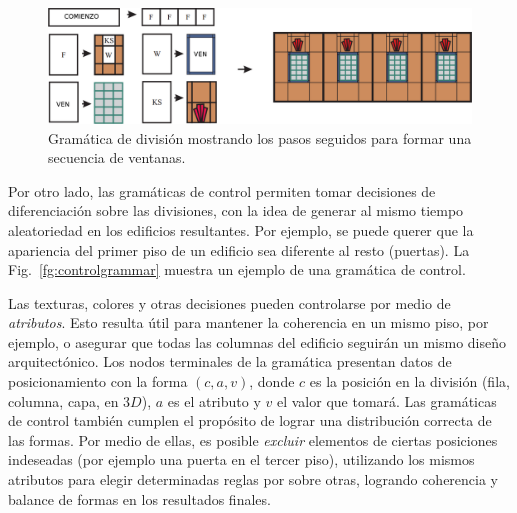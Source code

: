 \begin{figure}
\center
\includegraphics[width=13cm]{figures/splitgrammar}
\caption[Gramática para formar una secuencia de ventanas]{Gramática de división mostrando los pasos seguidos para formar una secuencia de ventanas.}
\label{fg:splitgrammar}
\end{figure}

Por otro lado, las gramáticas de control permiten tomar decisiones de diferenciación sobre las divisiones, con la idea de generar al mismo tiempo aleatoriedad en los edificios resultantes.
Por ejemplo, se puede querer que la apariencia del primer piso de un edificio sea diferente al resto (puertas).
La Fig.~\ref{fg:controlgrammar} muestra un ejemplo de una gramática de control.

Las texturas, colores y otras decisiones pueden controlarse por medio de {\em atributos}.
Esto resulta útil para mantener la coherencia en un mismo piso, por ejemplo, o asegurar que todas las columnas del edificio seguirán un mismo diseño arquitectónico.
Los nodos terminales de la gramática presentan datos de posicionamiento con la forma $(c,a,v)$, donde $c$ es la posición en la división (fila, columna, capa, en $3D$), $a$ es el atributo y $v$ el valor que tomará.
Las gramáticas de control también cumplen el propósito de lograr una distribución correcta de las formas.
Por medio de ellas, es posible {\em excluir} elementos de ciertas posiciones indeseadas (por ejemplo una puerta en el tercer piso), utilizando los mismos atributos para elegir determinadas reglas por sobre otras, logrando coherencia y balance de formas en los resultados finales.

